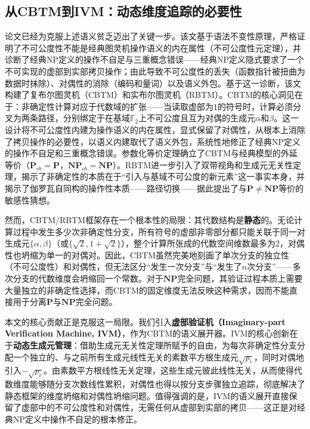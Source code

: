 \documentclass{ctexart}
\begin{document}
	\subsection{从CBTM到IVM：动态维度追踪的必要性}
	
	论文\cite{models2026}已经为克服上述语义贫乏迈出了关键一步。该文基于语法不变性原理，严格证明了不可公度性不能是经典图灵机操作语义的内在属性（不可公度性元定理），并诊断了经典NP定义的操作不自足与三重概念错误——经典NP定义隐式要求了一个不可实现的虚部到实部拷贝操作；由此导致不可公度性的丢失（函数指针被扭曲为数据时抹除）、对偶性的消除（编码和量词）以及语义外包。基于这一诊断，该文构建了复布尔图灵机（CBTM）和实布尔图灵机（RBTM）。CBTM的核心洞见在于：非确定性计算对应于代数域的扩张——当读取虚部为$1$的符号时，计算必须分叉为两条路径，分别绑定于在基域$\mathbb{F}_2$上不可公度且互为对偶的生成元$\alpha$和$\beta$。这一设计将不可公度性内建为操作语义的内在属性，显式保留了对偶性，从根本上消除了拷贝操作的必要性，以语义内建取代了语义外包，系统性地修正了经典NP定义的操作不自足和三重概念错误。参数化等价定理确立了CBTM与经典模型的外延等价（$\mathbf{P}_{cb}=\mathbf{P}$，$\mathbf{NP}_{cb}=\mathbf{NP}$）。RBTM进一步引入了双带视角和生成元无关性定理，揭示了非确定性的本质在于``引入与基域不可公度的新元素''这一事实本身，并揭示了伽罗瓦自同构的操作性本质——路径切换——据此提出了与$\mathbf{P}\neq\mathbf{NP}$等价的敏感性猜想。
	
	然而，CBTM/RBTM框架存在一个根本性的局限：其代数结构是\textbf{静态}的。无论计算过程中发生多少次非确定性分支，所有符号的虚部非零部分都只能关联于同一对生成元$\{\alpha, \beta\}$（或$\{\sqrt{2}, 1+\sqrt{2}\}$），整个计算所张成的代数空间维数最多为$2$，对偶性也坍缩为单一的对偶对。因此，CBTM虽然完美地刻画了单次分支的独立性（不可公度性）和对偶性，但无法区分``发生一次分支''与``发生了$n$次分支''——多次分支的代数维度会坍缩回一个常数。对于$\mathbf{NP}$完全问题，其验证过程本质上需要大量独立的非确定性选择，而CBTM的固定维度无法反映这种需求，因而不能直接用于分离$\mathbf{P}$与$\mathbf{NP}$完全问题。
	
	本文的核心贡献正是克服这一局限。我们引入\textbf{虚部验证机（Imaginary-part Verification Machine, IVM）}，作为CBTM的语义展开器。IVM的核心创新在于\textbf{动态生成元管理}：借助生成元无关性定理所赋予的自由，为每次非确定性分支分配一个独立的、与之前所有生成元线性无关的素数平方根生成元$\sqrt{p_i}$，同时对偶地引入$-\sqrt{p_i}$。由素数平方根线性无关定理，这些生成元彼此线性无关，从而使得代数维度能够随分支次数线性累积，对偶性也得以按分支步骤独立追踪，彻底解决了静态框架的维度坍缩和对偶性坍缩问题。值得强调的是，IVM的语义展开直接保留了虚部中的不可公度性和对偶性，无需任何从虚部到实部的拷贝——这正是对经典NP定义中操作不自足的根本修正。
	
\end{document}
